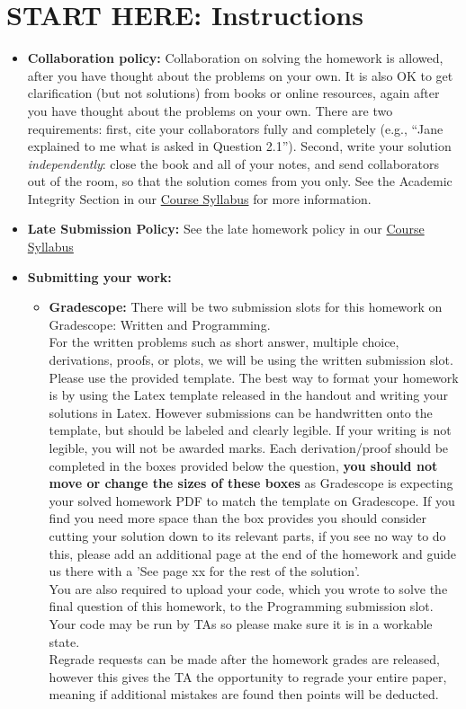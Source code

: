 \documentclass{article}
\begin{document}
\section*{START HERE: Instructions}
\begin{itemize}
\item \textbf{Collaboration policy:} Collaboration on solving the homework is allowed, after you have thought about the problems on your own. It is also OK to get clarification (but not solutions) from books or online resources, again after you have thought about the problems on your own. There are two requirements: first, cite your collaborators fully and completely (e.g., ``Jane explained to me what is asked in Question 2.1''). Second, write your solution {\em independently}: close the book and all of your notes, and send collaborators out of the room, so that the solution comes from you only. See the Academic Integrity Section in our \href{\currentsyllabus}{Course Syllabus} for more information.

\item\textbf{Late Submission Policy:} See the late homework policy in our \href{\currentsyllabus}{Course Syllabus}

\item\textbf{Submitting your work:}

\begin{itemize}

\item \textbf{Gradescope:} There will be two submission slots for this homework on Gradescope: Written and Programming. \\
For the written problems such as short answer, multiple choice, derivations, proofs, or plots, we will be using the written submission slot. Please use the provided template. The best way to format your homework is by using the Latex template released in the handout and writing your solutions in Latex. However submissions can be handwritten onto the template, but should be labeled and clearly legible. If your writing is not legible, you will not be awarded marks.  Each derivation/proof should be  completed in the boxes provided below the question, \textbf{you should not move or change the sizes of these boxes} as Gradescope is expecting your solved homework PDF to match the template on Gradescope. If you find you need more space than the box provides you should consider cutting your solution down to its relevant parts, if you see no way to do this, please add an additional page at the end of the homework and guide us there with a 'See page xx for the rest of the solution'.\\
You are also required to upload your code, which you wrote to solve the final question of this homework, to the Programming submission slot. Your code may be run by TAs so please make sure it is in a workable state.\\
Regrade requests can be made after the homework grades are released, however this gives the TA the opportunity to regrade your entire paper, meaning if additional mistakes are found then points will be deducted.
\end{itemize}

\end{itemize}
\end{document}
